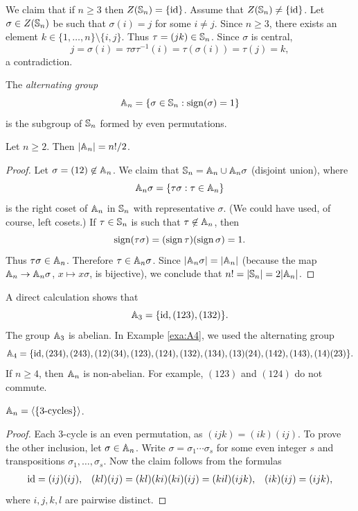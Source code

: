 \begin{example}
We claim that if $n\geq3$ then $Z(\mathbb{S}_n)=\{\operatorname{id}\}$.
Assume that $Z(\mathbb{S}_n)\ne\{\operatorname{id}\}$. Let 
$\sigma\in Z(\mathbb{S}_n)$ be such that $\sigma(i)=j$ for some $i\ne j$. 
Since $n\geq3$, there exists an element $k\in\{1,\dots,n
\}\setminus\{i,j\}$. Thus 
$\tau=(jk)\in\mathbb{S}_n$. Since $\sigma$ is central, 
\[
j=\sigma(i)=\tau\sigma\tau^{-1}(i)=\tau(\sigma(i))=\tau(j)=k,
\]
a contradiction.
\end{example}

\begin{definition}   
The \emph{alternating group}
\[
\mathbb{A}_n=\{\sigma\in\mathbb{S}_n:\operatorname{sign}(\sigma)=1\}
\]
is the subgroup of $\mathbb{S}_n$ formed by even permutations. 
\end{definition}

\begin{proposition}
Let $n\geq2$. Then 
$|\mathbb{A}_n|=n!/2$.
\end{proposition}

\begin{proof}
Let $\sigma=(12)\not\in\mathbb{A}_n$. We claim that 
$\mathbb{S}_n=\mathbb{A}_n\cup\mathbb{A}_n\sigma$ (disjoint union), where 
\[
\mathbb{A}_n\sigma=\{\tau\sigma:\tau\in\mathbb{A}_n\}
\]
is the right coset of $\mathbb{A}_n$ in $\mathbb{S}_n$ with 
representative $\sigma$. (We could have used, of course, left cosets.)
If 
$\tau\in\mathbb{S}_n$ is such that $\tau\not\in\mathbb{A}_n$, then 
\[
\operatorname{sign}(\tau\sigma)=(\operatorname{sign}\tau)(\operatorname{sign}\sigma)=1.
\]
Thus 
$\tau\sigma\in\mathbb{A}_n$. Therefore $\tau\in\mathbb{A}_n\sigma$. Since  $|\mathbb{A}_n\sigma|=|\mathbb{A}_
n|$ (because the map $\mathbb{A}_n\to\mathbb{A}_n\sigma$, $x\mapsto x\sigma$, is bijective), we conclude that 
$n!=|\mathbb{S}_n|=2|\mathbb{A}_n|$.
\end{proof}

A direct calculation shows that  
\[
\mathbb{A}_3=\{\operatorname{id},(123),(132)\}.
\]
The group $\mathbb{A}_3$ is abelian.
In Example \ref{exa:A4}, we used the alternating group 
\[ 
\mathbb{A}_4=\{\operatorname{id},(234),(243),(12)(34),(123),(124),(132),(134),(13)(24),(142),(143),(14)(23)\}.
\]
If $n\geq4$, then $\mathbb{A}_n$ is non-abelian. For example, 
$(123)$ and $(124)$ do not commute. 

\begin{proposition}
\label{pro:A_n3cycles}
$\mathbb{A}_n=\langle\{\text{3-cycles}\}\rangle$.
\end{proposition}

\begin{proof}
Each 3-cycle is an even permutation, as $(ijk)=(ik)(ij)$. 
To prove the other inclusion, let $\sigma\in\mathbb{A}_n$.
Write $\sigma=\sigma_1\cdots\sigma_s$ for some even integer $s$ 
and transpositions $\sigma_1,\dots,\sigma_s$. 
Now the claim follows from the formulas 
\begin{align*}
\operatorname{id}=(ij)(ij),&&
(kl)(ij)=(kl)(ki)(ki)(ij)=(kil)(ijk), 
&&(ik)(ij)=(ijk),
\end{align*}
where $i,j,k,l$ are pairwise distinct. 
 \end{proof}

